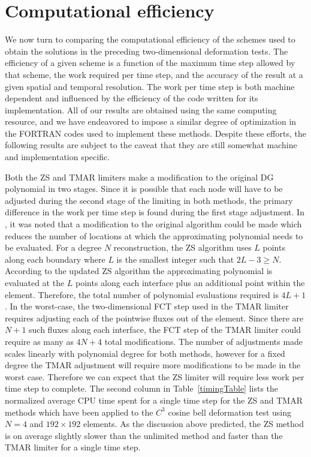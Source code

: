 \documentclass{ametsoc}
\begin{document}
\section{Computational efficiency} \label{sec:Efficiency}

We now turn to comparing the computational efficiency of the schemes used to obtain the solutions in the preceding two-dimensional deformation tests. The efficiency of a given scheme is a function of the maximum time step allowed by that scheme, the work required per time step, and the accuracy of the result at a given spatial and temporal resolution.  The work per time step is both machine dependent and influenced by the efficiency of the code written for its implementation. All of our results are obtained using the same computing resource, and we have endeavored to impose a similar degree of optimization in the FORTRAN codes used to implement these methods. Despite these efforts, the following results are subject to the caveat that they are still somewhat machine and implementation specific.

Both the ZS and TMAR limiters make a modification to the original DG polynomial in two stages. Since it is possible that each node will have to be adjusted during the second stage of the limiting in both methods, the primary difference in the work per time step is found during the first stage adjustment. In \citet{Zhang:2011aa}, it was noted that a modification to the original algorithm could be made which reduces the number of locations at which the approximating polynomial needs to be evaluated. For a degree $N$ reconstruction, the ZS algorithm uses $L$ points along each boundary where $L$ is the smallest integer such that $2L-3 \geq N$. According to the updated ZS algorithm the approximating polynomial is evaluated at the $L$ points along each interface plus an additional point within the element. Therefore, the total number of polynomial evaluations required is $4L+1$. In the worst-case, the two-dimensional FCT step used in the TMAR limiter requires adjusting each of the pointwise fluxes out of the element. Since there are $N+1$ such fluxes along each interface, the FCT step of the TMAR limiter could require as many as $4N+4$ total modifications. The number of adjustments made scales linearly with polynomial degree for both methods, however for a fixed degree the TMAR adjustment will require more modifications to be made in the worst case. Therefore we can expect that the ZS limiter will require less work per time step to complete. The second column in Table~\ref{timingTable} lists the normalized average CPU time spent for a single time step for the ZS and TMAR methods which have been applied to the $C^3$ cosine bell deformation test using $N=4$ and $192\times192$ elements. As the discussion above predicted, the ZS method is on average slightly slower than the unlimited method and faster than the TMAR limiter for a single time step. 
\end{document}
